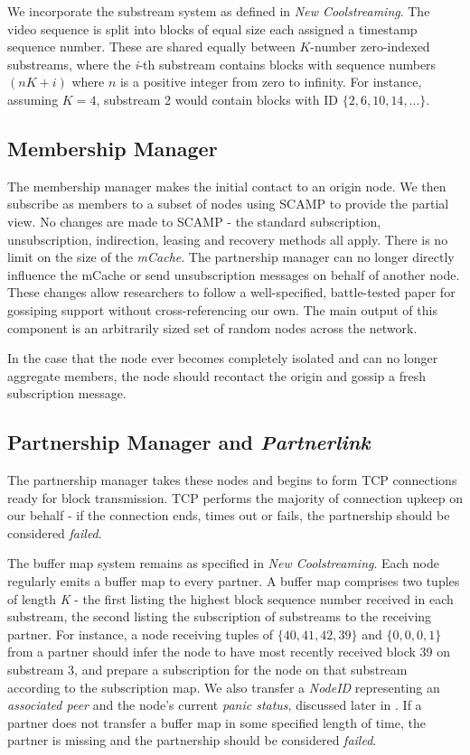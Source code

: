 \documentclass[12pt,a4paper]{article}
\begin{document}
We incorporate the substream system as defined in \textit{New Coolstreaming}. The video sequence is split into blocks of equal size each assigned a timestamp sequence number. These are shared equally between \(K\)-number zero-indexed substreams, where the \textit{i}-th substream contains blocks with sequence numbers \((nK + \textit{i})\) where \(n\) is a positive integer from zero to infinity. For instance, assuming \(K = 4\), substream 2 would contain blocks with ID \(\{2, 6, 10, 14, ...\}\).

\subsection{Membership Manager}
The membership manager makes the initial contact to an origin node. We then subscribe as members to a subset of nodes using SCAMP to provide the partial view. No changes are made to SCAMP - the standard subscription, unsubscription, indirection, leasing and recovery methods all apply. There is no limit on the size of the \textit{mCache}. The partnership manager can no longer directly influence the mCache or send unsubscription messages on behalf of another node. These changes allow researchers to follow a well-specified, battle-tested paper for gossiping support without cross-referencing our own. The main output of this component is an arbitrarily sized set of random nodes across the network.

In the case that the node ever becomes completely isolated and can no longer aggregate members, the node should recontact the origin and gossip a fresh subscription message.

\subsection{Partnership Manager and \textit{Partnerlink}}
The partnership manager takes these nodes and begins to form TCP connections ready for block transmission. TCP performs the majority of connection upkeep on our behalf - if the connection ends, times out or fails, the partnership should be considered \textit{failed}.

The buffer map system remains as specified in \textit{New Coolstreaming}. Each node regularly emits a buffer map to every partner. A buffer map comprises two tuples of length \textit{K} - the first listing the highest block sequence number received in each substream, the second listing the subscription of substreams to the receiving partner. For instance, a node receiving tuples of \(\{40, 41, 42, 39\}\) and \(\{0, 0, 0, 1\}\) from a partner should infer the node to have most recently received block 39 on substream 3, and prepare a subscription for the node on that substream according to the subscription map. We also transfer a \textit{NodeID} representing an \textit{associated peer} and the node's current \textit{panic status}, discussed later in . If a partner does not transfer a buffer map in some specified length of time, the partner is missing and the partnership should be considered \textit{failed}.
\end{document}
